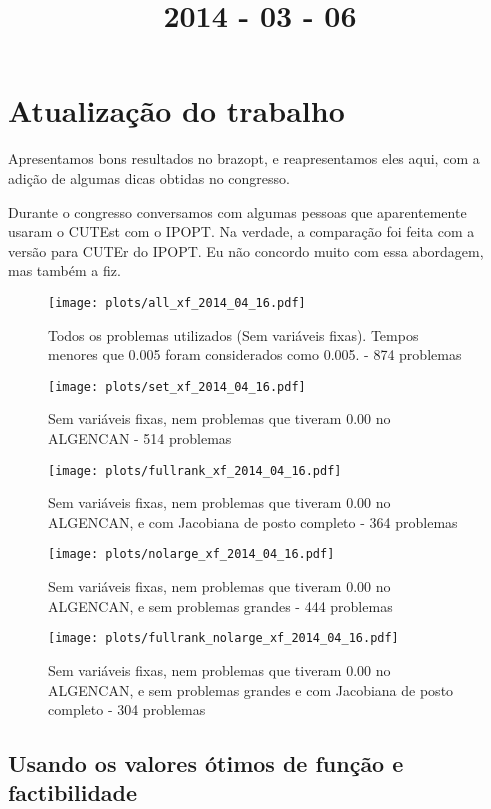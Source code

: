 \documentclass{article}
\title{2014 - 03 - 06}
\author{}
\date{}
\begin{document}
\maketitle
\section{Atualização do trabalho}

Apresentamos bons resultados no brazopt, e reapresentamos eles aqui, com a
adição de algumas dicas obtidas no congresso.

Durante o congresso conversamos com algumas pessoas que aparentemente usaram o
CUTEst com o IPOPT. Na verdade, a comparação foi feita com a versão para CUTEr
do IPOPT. Eu não concordo muito com essa abordagem, mas também a fiz.

\begin{figure}[H]
  \centering
  \texttt{[image: plots/all\_xf\_2014\_04\_16.pdf]}
  \caption{Todos os problemas utilizados (Sem variáveis fixas). Tempos menores
    que 0.005 foram considerados como 0.005. - 874 problemas}
\end{figure}
\begin{figure}[H]
  \centering
  \texttt{[image: plots/set\_xf\_2014\_04\_16.pdf]}
  \caption{Sem variáveis fixas, nem problemas
    que tiveram 0.00 no ALGENCAN - 514 problemas}
\end{figure}
\begin{figure}[H]
  \centering
  \texttt{[image: plots/fullrank\_xf\_2014\_04\_16.pdf]}
  \caption{Sem variáveis fixas, nem problemas
    que tiveram 0.00 no ALGENCAN, e com Jacobiana de posto completo - 364
    problemas}
\end{figure}
\begin{figure}[H]
  \centering
  \texttt{[image: plots/nolarge\_xf\_2014\_04\_16.pdf]}
  \caption{Sem variáveis fixas, nem problemas
    que tiveram 0.00 no ALGENCAN, e sem problemas grandes - 444 problemas}
\end{figure}
\begin{figure}[H]
  \centering
  \texttt{[image: plots/fullrank\_nolarge\_xf\_2014\_04\_16.pdf]}
  \caption{Sem variáveis fixas, nem problemas
    que tiveram 0.00 no ALGENCAN, e sem problemas grandes e com Jacobiana de
    posto completo - 304 problemas}
\end{figure}

\subsection{Usando os valores ótimos de função e factibilidade}
\end{document}
